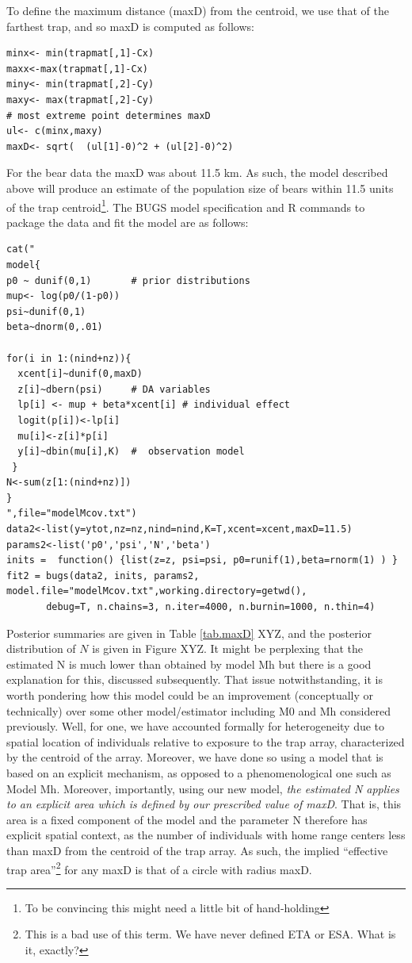 To define the maximum distance (maxD) from the centroid, we use that
of the farthest trap, and so maxD is computed as follows:

\begin{verbatim}
minx<- min(trapmat[,1]-Cx)
maxx<-max(trapmat[,1]-Cx)
miny<- min(trapmat[,2]-Cy)
maxy<- max(trapmat[,2]-Cy)
# most extreme point determines maxD
ul<- c(minx,maxy)
maxD<- sqrt(  (ul[1]-0)^2 + (ul[2]-0)^2)
\end{verbatim}

For the bear data the maxD was about 11.5 km. As such, the model
described above will produce an estimate of the population size of
bears within 11.5 units of the trap centroid\footnote{To be convincing
  this might  need a little bit of hand-holding}. The BUGS model
specification and R commands to package the data and fit the model are
as follows:

\begin{verbatim}
cat("
model{
p0 ~ dunif(0,1)       # prior distributions
mup<- log(p0/(1-p0))
psi~dunif(0,1)
beta~dnorm(0,.01)

for(i in 1:(nind+nz)){
  xcent[i]~dunif(0,maxD)
  z[i]~dbern(psi)     # DA variables
  lp[i] <- mup + beta*xcent[i] # individual effect
  logit(p[i])<-lp[i]
  mu[i]<-z[i]*p[i]
  y[i]~dbin(mu[i],K)  #  observation model
 }
N<-sum(z[1:(nind+nz)])
}
",file="modelMcov.txt")
data2<-list(y=ytot,nz=nz,nind=nind,K=T,xcent=xcent,maxD=11.5)
params2<-list('p0','psi','N','beta')
inits =  function() {list(z=z, psi=psi, p0=runif(1),beta=rnorm(1) ) }
fit2 = bugs(data2, inits, params2, model.file="modelMcov.txt",working.directory=getwd(),    
       debug=T, n.chains=3, n.iter=4000, n.burnin=1000, n.thin=4)
\end{verbatim}

Posterior summaries are given in Table \ref{tab.maxD} XYZ, and the posterior distribution of $N$ is given in Figure XYZ. It might be perplexing that the estimated N is much lower than obtained by model Mh but there is a good explanation for this, discussed subsequently. That issue notwithstanding, it is worth pondering how this model could be an improvement (conceptually or technically) over some other model/estimator including M0 and Mh considered previously. Well, for one, we have accounted formally for heterogeneity due to spatial location of individuals relative to exposure to the trap array, characterized by the centroid of the array. Moreover, we have done so using a model that is based on an explicit mechanism, as opposed to a phenomenological one such as Model Mh. Moreover, importantly, using our new model, {\it the estimated N applies to an explicit area which is defined by our prescribed value of maxD}. That is, this area is a fixed component of the model and the parameter N therefore has explicit spatial context, as the number of individuals with home range centers less than maxD from the centroid of the trap array. As such, the implied ``effective trap area''\footnote{This is a bad use of this term. We have never defined ETA or ESA. What is it, exactly?} for any maxD is that of a circle with radius maxD. 

